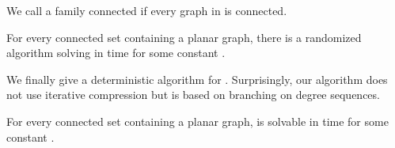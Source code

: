 We call a family  connected if every graph in  is connected. 

  \begin{theorem}\label{thm:fpt_thm1}
  For every connected  set    containing a planar graph,  there is a randomized algorithm solving 
\fd{}   in time  for some constant . 
\end{theorem}

We finally give a deterministic algorithm for \fd{}. Surprisingly, our algorithm does not use iterative compression but  is based on branching on degree sequences. 


  \begin{theorem}\label{thm:fpt_thm2}
  For every connected set     containing a planar graph,  
\fd{}  is solvable   in time   for some constant . 
\end{theorem}





 










